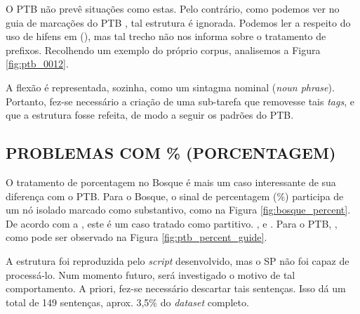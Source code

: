 \begin{center}
    
\end{center}

O PTB não prevê situações como estas. Pelo contrário, como podemos ver no guia de marcações do PTB \cite[p~315]{bracketing_ptb}, tal estrutura é ignorada. Podemos ler a respeito do uso de hifens em (\textit{}), mas tal trecho não nos informa sobre o tratamento de prefixos. Recolhendo um exemplo do próprio corpus, analisemos a Figura \ref{fig:ptb_0012}.

\begin{center}
    
\end{center}

A flexão  é representada, sozinha, como um sintagma nominal (\textit{noun phrase}). Portanto, fez-se necessário a criação de uma sub-tarefa que removesse tais \textit{tags}, e que a estrutura fosse refeita, de modo a seguir os padrões do PTB.

\subsection{PROBLEMAS COM \% (PORCENTAGEM)}
\label{subsec:percent}
O tratamento de porcentagem no Bosque é mais um caso interessante de sua diferença com o PTB.
Para o Bosque, o sinal de percentagem (\%) participa de um nó isolado marcado como substantivo, como na Figura \ref{fig:bosque_percent}. De acordo com a \cite[p~113-114]{afonso2006arvores}, este é um caso tratado como partitivo. , e . Para o PTB, , como pode ser observado na Figura \ref{fig:ptb_percent_guide}.
\begin{center}
    
\end{center}
A estrutura foi reproduzida pelo \textit{script} desenvolvido, mas o SP não foi capaz de processá-lo. Num momento futuro, será investigado o motivo de tal comportamento. A priori, fez-se necessário descartar tais sentenças. Isso dá um total de 149 sentenças, aprox. 3,5\% do \textit{dataset} completo.
\begin{center}
    
\end{center}
